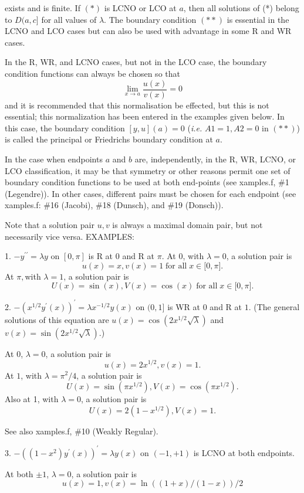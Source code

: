 \documentclass[12pt]{amsart}%
\theoremstyle{plain}
\numberwithin{equation}{section}
\numberwithin{theorem}{section}
\begin{document}
\noindent exists and is finite. If $(\ast)$ is LCNO or LCO at $a$, then all
solutions of (*) belong to $D(a,c]$ for all values of $\lambda.$ The boundary
condition $(\ast\ast)$ is essential in the LCNO and LCO cases but can also be
used with advantage in some R and WR cases.

In the R, WR, and LCNO cases, but not in the LCO case, the boundary condition
functions can always be chosen so that%
\[
\lim_{x\rightarrow a}\frac{u(x)}{v(x)}=0
\]
and it is recommended that this normalisation be effected, but this is not
essential; this normalization has been entered in the examples given below. In
this case, the boundary condition $[y,u](a)=0$ (\textit{i.e. }$A1=1,A2=0$ in
$(\ast\ast)$) is called the principal or Friedrichs boundary condition at $a$.

In the case when endpoints $a$ and $b$ are, independently, in the R, WR, LCNO,
or LCO classification, it may be that symmetry or other reasons permit one set
of boundary condition functions to be used at both end-points (see xamples.f,
\#1 (Legendre)). In other cases, different pairs must be chosen for each
endpoint (see xamples.f: \#16 (Jacobi), \#18 (Dunsch), and \#19 (Donsch)).

Note that a solution pair $u,v$ is always a maximal domain pair, but not
necessarily vice versa. EXAMPLES:

1. $-y^{\prime\prime}=\lambda y$ on $[0,\pi]$ is R at $0$ and R at $\pi.$ At
$0$, with $\lambda=0$, a solution pair is
\[
u(x)=x,v(x)=1\;\text{for all}\;x\in\lbrack0,\pi].
\]
At $\pi,$with $\lambda=1$, a solution pair is%
\[
U(x)=\sin(x),V(x)=\cos(x)\;\text{for all}\;x\in\lbrack0,\pi].
\]

2. $-(x^{1/2}y^{\prime}(x))^{\prime}=\lambda x^{-1/2}y(x)$ on $(0,1]$ is WR at
$0$ and R at $1.$ (The general solutions of this equation are $u(x)=\cos
(2x^{1/2}\sqrt{\lambda})$ and $v(x)=\sin(2x^{1/2}\sqrt{\lambda})$.)

At $0$, $\lambda=0$, a solution pair is%
\[
u(x)=2x^{1/2},v(x)=1.
\]
At $1$, with $\lambda=\pi^{2}/4$, a solution pair is%
\[
U(x)=\sin(\pi x^{1/2}),V(x)=\cos(\pi x^{1/2}).
\]
Also at 1, with $\lambda=0$, a solution pair is%
\[
U(x)=2(1-x^{1/2}),V(x)=1.
\]

See also xamples.f, \#10 (Weakly Regular).

3. $-((1-x^{2})y^{\prime}(x))^{\prime}=\lambda y(x)$ on $(-1,+1)$ is LCNO at
both endpoints.

At both $\pm1$, $\lambda=0$, a solution pair is%
\[
u(x)=1,v(x)=\ln((1+x)/(1-x))/2
\]
\end{document}

